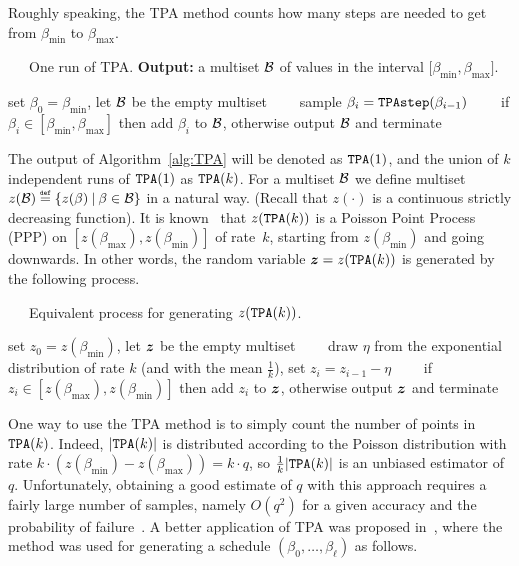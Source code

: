 \documentclass[final,12pt]{colt2018}
\newcommand{\eqdef}{{\stackrel{\mbox{\tiny \tt ~def~}}{=}}}
\def\bmin{{\beta_{\min}}}
\def\bmax{{\beta_{\max}}}
\def\calB{{\cal B}}
\newcommand{\bz}{\mbox{\boldmath $z$}}
\begin{document}
Roughly speaking, the TPA method counts how many steps are needed to get from $\bmin$ to $\bmax$.

\begin{algorithm}[h]
\caption{~~~One run of TPA. {\bf Output:} a multiset $\calB$ of values in the interval  ${[}\bmin,\bmax{]}$. 
 \label{alg:TPA}
}
\begin{algorithmic}[1]
\State set $\beta_0 = \bmin$, let $\calB$  be the empty multiset
	\State ~~~~sample $\beta_{i}={\tt TPAstep}(\beta_{i-1})$ 
	\State ~~~~if $\beta_{i}\in[\bmin,\bmax]$ then add $\beta_{i}$ to $\calB$, otherwise output $\calB$ and terminate
\end{algorithmic}
\end{algorithm}
%
The output of Algorithm~\ref{alg:TPA} will be denoted as ${\tt TPA}(1)$,
and the union of $k$ independent runs of ${\tt TPA}(1)$ as ${\tt TPA}(k)$.
For a multiset $\calB$ we define multiset $z(\calB)\eqdef\{z(\beta)\:|\:\beta\in\calB\}$ in a natural way.
 (Recall that $z(\cdot)$ is a continuous strictly decreasing function).
It is known~\citep{TPA,TPA:journal} that $z({\tt TPA}(k))$ is a Poisson Point Process (PPP) on $[z(\bmax),z(\bmin)]$ of rate~$k$,
starting from $z(\bmin)$ and going downwards.
In other words, the random variable ${\bz}=z({\tt TPA}(k))$ is generated by the following process.

\begin{algorithm}[h]
\caption{~~~Equivalent process for generating $z({\tt TPA}(k))$.\label{alg:PPP}}
\begin{algorithmic}[1]
\State set $z_0=z(\bmin)$, let ${\bz}$ be the empty multiset
	\State ~~~~draw $\eta$ from the exponential distribution of rate $k$ (and with the mean $\frac{1}{k}$), set $z_i=z_{i-1}-\eta$
	\State ~~~~if $z_i\in[z(\bmax),z(\bmin)]$ then add $z_i$ to ${\bz}$, otherwise output ${\bz}$ and terminate
\end{algorithmic}
\end{algorithm}

One way to use the TPA method is to simply count the number of points in ${\tt TPA}(k)$.
Indeed, $|{\tt TPA}(k)|$ is distributed according to the Poisson distribution with rate $k\cdot(z(\bmin)-z(\bmax))=k\cdot q$,
so $\frac{1}{k}|{\tt TPA}(k)|$ is an unbiased estimator of $q$.
Unfortunately, obtaining a good estimate of $q$ with this approach requires a fairly large number of samples, namely  
$O(q^2)$ for a given accuracy and  the probability
of failure~\citep{TPA,TPA:journal}. A better application of TPA
was proposed in~\citep{Huber:Gibbs},
where the method was used for generating a schedule $(\beta_0,\ldots,\beta_\ell)$ as follows.
\end{document}
